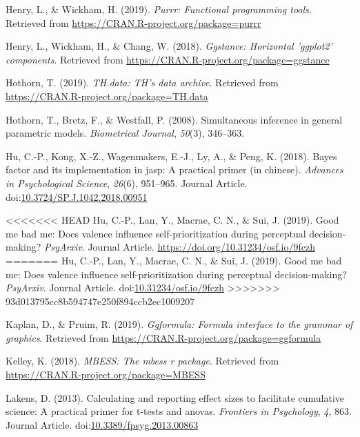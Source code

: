 \documentclass[
  man]{apa6}
\begin{document}
\leavevmode\hypertarget{ref-R-purrr}{}%
Henry, L., \& Wickham, H. (2019). \emph{Purrr: Functional programming tools}. Retrieved from \url{https://CRAN.R-project.org/package=purrr}

\leavevmode\hypertarget{ref-R-ggstance}{}%
Henry, L., Wickham, H., \& Chang, W. (2018). \emph{Ggstance: Horizontal 'ggplot2' components}. Retrieved from \url{https://CRAN.R-project.org/package=ggstance}

\leavevmode\hypertarget{ref-R-TH.data}{}%
Hothorn, T. (2019). \emph{TH.data: TH's data archive}. Retrieved from \url{https://CRAN.R-project.org/package=TH.data}

\leavevmode\hypertarget{ref-R-multcomp}{}%
Hothorn, T., Bretz, F., \& Westfall, P. (2008). Simultaneous inference in general parametric models. \emph{Biometrical Journal}, \emph{50}(3), 346--363.

\leavevmode\hypertarget{ref-Hu_2018_JASP}{}%
Hu, C.-P., Kong, X.-Z., Wagenmakers, E.-J., Ly, A., \& Peng, K. (2018). Bayes factor and its implementation in jasp: A practical primer (in chinese). \emph{Advances in Psychological Science}, \emph{26}(6), 951--965. Journal Article. doi:\href{https://doi.org/10.3724/SP.J.1042.2018.00951}{10.3724/SP.J.1042.2018.00951}

\leavevmode\hypertarget{ref-Hu_2019_GoodSelf}{}%
<<<<<<< HEAD
Hu, C.-P., Lan, Y., Macrae, C. N., \& Sui, J. (2019). Good me bad me: Does valence influence self-prioritization during perceptual decision-making? \emph{PsyArxiv}. Journal Article. \url{https://doi.org/10.31234/osf.io/9fczh}
=======
Hu, C.-P., Lan, Y., Macrae, C. N., \& Sui, J. (2019). Good me bad me: Does valence influence self-prioritization during perceptual decision-making? \emph{PsyArxiv}. Journal Article. doi:\href{https://doi.org/10.31234/osf.io/9fczh}{10.31234/osf.io/9fczh}
>>>>>>> 93d013795cc8b594747e250f894ccb2ec1009207

\leavevmode\hypertarget{ref-R-ggformula}{}%
Kaplan, D., \& Pruim, R. (2019). \emph{Ggformula: Formula interface to the grammar of graphics}. Retrieved from \url{https://CRAN.R-project.org/package=ggformula}

\leavevmode\hypertarget{ref-R-MBESS}{}%
Kelley, K. (2018). \emph{MBESS: The mbess r package}. Retrieved from \url{https://CRAN.R-project.org/package=MBESS}

\leavevmode\hypertarget{ref-Lakens_2013}{}%
Lakens, D. (2013). Calculating and reporting effect sizes to facilitate cumulative science: A practical primer for t-tests and anovas. \emph{Frontiers in Psychology}, \emph{4}, 863. Journal Article. doi:\href{https://doi.org/10.3389/fpsyg.2013.00863}{10.3389/fpsyg.2013.00863}
\end{document}

